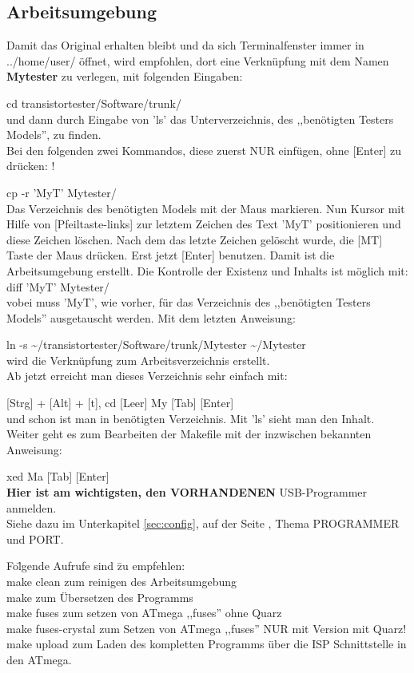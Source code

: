 \subsection{Arbeitsumgebung}

Damit das Original erhalten bleibt und da sich Terminalfenster immer in ../home/\glqq user\grqq/ öffnet, wird empfohlen, dort eine Verknüpfung mit dem Namen {\bf Mytester} zu verlegen, mit folgenden Eingaben:

cd transistortester/Software/trunk/\\
und dann durch Eingabe von 'ls' das Unterverzeichnis, des ,,benötigten Testers Models'', zu finden.\\
Bei den folgenden zwei Kommandos, diese zuerst NUR einfügen, ohne [Enter] zu drücken: !

cp -r 'MyT' Mytester/\\
Das Verzeichnis des benötigten Models mit der Maus markieren.
Nun Kursor mit Hilfe von [Pfeiltaste-links] zur letztem Zeichen des Text 'MyT' positionieren und
diese Zeichen löschen. Nach dem das letzte Zeichen gelöscht wurde, die [MT] Taste der Maus drücken.
Erst jetzt [Enter] benutzen. Damit ist die Arbeitsumgebung erstellt.
Die Kontrolle der Existenz und Inhalts ist möglich mit:\\

diff 'MyT' Mytester/\\
vobei muss 'MyT', wie vorher, für das Verzeichnis des ,,benötigten Testers Models'' ausgetauscht werden.
Mit dem letzten Anweisung:

ln -s \textasciitilde/transistortester/Software/trunk/Mytester \textasciitilde/Mytester\\
wird die Verknüpfung zum Arbeitsverzeichnis erstellt.\\ 
Ab jetzt erreicht man dieses Verzeichnis sehr einfach mit:

[Strg] + [Alt] + [t], cd [Leer] My [Tab] [Enter]\\
und schon ist man in benötigten Verzeichnis. Mit 'ls' sieht man den Inhalt.\\
Weiter geht es zum Bearbeiten der Makefile mit der inzwischen bekannten Anweisung:

xed Ma [Tab] [Enter]\\
{\bf Hier ist am wichtigsten, den VORHANDENEN} USB-Programmer anmelden.\\
Siehe dazu im Unterkapitel \ref{sec:config}, auf der Seite \pageref{sec:config-Prog}, Thema PROGRAMMER 
und PORT.

\begin{tabbing}
Fo\=lgende Aufrufe sind \=zu empfehlen:\\
\> make clean \> zum reinigen des Arbeitsumgebung\\
\> make       \> zum Übersetzen des Programms\\
\> make fuses \> zum setzen von ATmega ,,fuses'' ohne Quarz\\
\> make fuses-crystal \> zum Setzen von ATmega ,,fuses'' NUR mit Version mit Quarz!\\
\> make upload \> zum Laden des kompletten Programms über die ISP Schnittstelle in den ATmega.
\end{tabbing}

